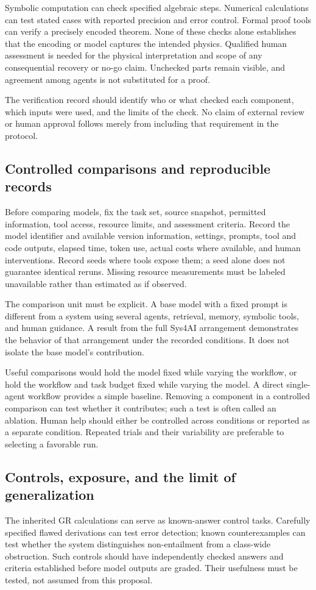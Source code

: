 \documentclass[11pt]{article}
\begin{document}
Symbolic computation can check specified algebraic steps. Numerical calculations can test stated cases with reported precision and error control. Formal proof tools can verify a precisely encoded theorem. None of these checks alone establishes that the encoding or model captures the intended physics. Qualified human assessment is needed for the physical interpretation and scope of any consequential recovery or no-go claim. Unchecked parts remain visible, and agreement among agents is not substituted for a proof.

The verification record should identify who or what checked each component, which inputs were used, and the limits of the check. No claim of external review or human approval follows merely from including that requirement in the protocol.

\subsection{Controlled comparisons and reproducible records}
Before comparing models, fix the task set, source snapshot, permitted information, tool access, resource limits, and assessment criteria. Record the model identifier and available version information, settings, prompts, tool and code outputs, elapsed time, token use, actual costs where available, and human interventions. Record seeds where tools expose them; a seed alone does not guarantee identical reruns. Missing resource measurements must be labeled unavailable rather than estimated as if observed.

The comparison unit must be explicit. A base model with a fixed prompt is different from a system using several agents, retrieval, memory, symbolic tools, and human guidance. A result from the full Sys4AI arrangement demonstrates the behavior of that arrangement under the recorded conditions. It does not isolate the base model's contribution.

Useful comparisons would hold the model fixed while varying the workflow, or hold the workflow and task budget fixed while varying the model. A direct single-agent workflow provides a simple baseline. Removing a component in a controlled comparison can test whether it contributes; such a test is often called an ablation. Human help should either be controlled across conditions or reported as a separate condition. Repeated trials and their variability are preferable to selecting a favorable run.

\subsection{Controls, exposure, and the limit of generalization}
The inherited GR calculations can serve as known-answer control tasks. Carefully specified flawed derivations can test error detection; known counterexamples can test whether the system distinguishes non-entailment from a class-wide obstruction. Such controls should have independently checked answers and criteria established before model outputs are graded. Their usefulness must be tested, not assumed from this proposal.
\end{document}

